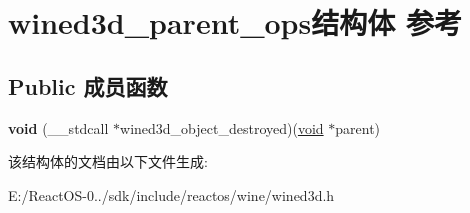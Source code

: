 \hypertarget{structwined3d__parent__ops}{}\section{wined3d\+\_\+parent\+\_\+ops结构体 参考}
\label{structwined3d__parent__ops}
\subsection*{Public 成员函数}
\begin{DoxyCompactItemize}
\item 
\mbox{\label{structwined3d__parent__ops_abbe084998472a385502fdd15b542396f}} 
{\bfseries void} (\+\_\+\+\_\+stdcall $\ast$wined3d\+\_\+object\+\_\+destroyed)(\hyperlink{interfacevoid}{void} $\ast$parent)
\end{DoxyCompactItemize}


该结构体的文档由以下文件生成\+:\begin{DoxyCompactItemize}
\item 
E\+:/\+React\+O\+S-\/0../sdk/include/reactos/wine/wined3d.\+h\end{DoxyCompactItemize}
